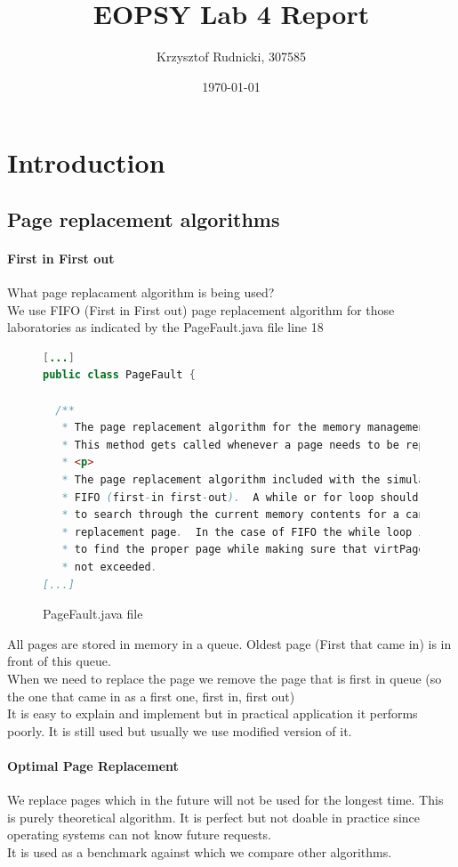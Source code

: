 \documentclass{article}
\begin{document}
\title{EOPSY Lab 4 Report}
\author{Krzysztof Rudnicki, 307585}
\date{\today}
\maketitle
\section{Introduction}
\subsection{Page replacement algorithms}
\paragraph{First in First out}
What page replacament algorithm is being used? \\
We use FIFO (First in First out) page replacement algorithm for those laboratories as indicated
by the PageFault.java file line 18
\begin{figure}[H]
\caption{PageFault.java file}
\begin{lstlisting}[language=Java]
[...]
public class PageFault {

  /**
   * The page replacement algorithm for the memory management sumulator.
   * This method gets called whenever a page needs to be replaced.
   * <p>
   * The page replacement algorithm included with the simulator is 
   * FIFO (first-in first-out).  A while or for loop should be used 
   * to search through the current memory contents for a canidate 
   * replacement page.  In the case of FIFO the while loop is used 
   * to find the proper page while making sure that virtPageNum is 
   * not exceeded.
[...]
\end{lstlisting}
\end{figure}
All pages are stored in memory in a queue. Oldest page (First that came in) is
in front of this queue. \\ When we need to replace the page we remove the page that
is first in queue (so the one that came in as a first one, first in, first out)
\\
It is easy to explain and implement but in practical application it performs
poorly. It is still used but usually we use modified version of it.
\cite{Page Replacement Algorithms}
\paragraph{Optimal Page Replacement}
We replace pages which in the future will not be used for the longest time.
This is purely theoretical algorithm. It is perfect but not doable in practice
since operating systems can not know future requests. \\
It is used as a benchmark against which we compare other algorithms. 
\cite{Page Replacement Algorithms}
\end{document}
